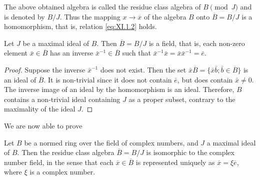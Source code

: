 \begin{definition}\label{def:XI.1.Definition.2} The above obtained algebra is called the residue class algebra of $B \pmod{J}$ and is denoted by $B / J$. Thus the mapping $x \to \overline{x}$ of the algebra $B$ onto $\overline{B} = B / J$ is a homomorphism, that is, relation \eqref{eq:XI.1.2} holds. 
\end{definition}

\begin{proposition}\label{prop:XI.1.Proposition.4} Let $J$ be a maximal ideal of $B$. Then $\overline{B}=B/J$ is a field, that is, each non-zero element $\bar{x}\in\overline{B}$ has an inverse $\bar{x}^{-1}\in\overline{B}$ such that $\bar{x}^{-1}\bar{x}=\bar{x}\bar{x}^{-1}=\bar{e}$. 
\end{proposition}

\begin{proof}
 Suppose the inverse $\bar{x}^{-1}$ does not exist. Then the set $\bar{x}\overline{B}=\{\bar{x}\bar{b};\bar{b}\in\overline{B}\}$ is an ideal of $\overline{B}$. It is non-trivial since it does not contain $\bar{e}$, but does contain $\bar{x}\neq0$. The inverse image of an ideal by the homomorphism is an ideal. Therefore, $B$ contains a non-trivial ideal containing $J$ as a proper subset, contrary to the maximality of the ideal $J$. 
\end{proof}

We are now able to prove 

\begin{theoremu} Let $B$ be a normed ring over the field of complex numbers, and $J$ a maximal ideal of $B$. Then the residue class algebra $\overline{B}=B/J$ is isomorphic to the complex number field, in the sense that each $\overline{x}\in\overline{B}$ is represented uniquely as $\overline{x}=\xi\overline{e}$, where $\xi$ is a complex number. 
\end{theoremu}

